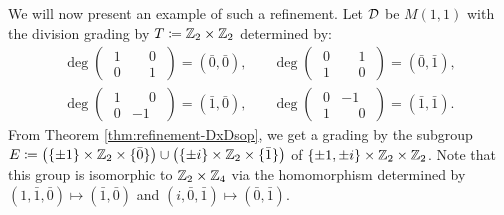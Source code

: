 We will now present an example of such a refinement.
Let $\mathcal{D}$ be $M(1,1)$ with the division grading by $T \coloneqq \mathbb{Z}_2 \times \mathbb{Z}_2$ determined by:
\begin{align*}
	\deg \begin{pmatrix}
		\phantom{.}1 & \phantom{-}0\phantom{.} \\
		\phantom{.}0 & \phantom{-}1\phantom{.}
	\end{pmatrix} = (\bar 0, \bar 0),\quad & \deg \begin{pmatrix}
		\phantom{.}0 & \phantom{-}1\phantom{.} \\
		\phantom{.}1 & \phantom{-}0\phantom{.}
	\end{pmatrix} = (\bar 0, \bar 1), \\
	\deg \begin{pmatrix}
		\phantom{.}1 & \phantom{-}0\phantom{.} \\
		\phantom{.}0 & -1\phantom{.}
	\end{pmatrix} = (\bar 1, \bar 0),\quad &
	\deg \begin{pmatrix}
		\phantom{.}0 & -1\phantom{.}           \\
		\phantom{.}1 & \phantom{-}0\phantom{.}
	\end{pmatrix} = (\bar 1, \bar 1).
\end{align*}
%
%
%
From Theorem \ref{thm:refinement-DxDsop}, we get a grading by the subgroup $E \coloneqq \big( \{ \pm 1 \} \times \mathbb{Z}_2 \times \{ \bar 0 \} \big) \cup \big( \{ \pm i \} \times \mathbb{Z}_2 \times \{ \bar 1 \} \big)$ of $\{\pm 1, \pm i\} \times \mathbb{Z}_2 \times \mathbb{Z}_2$.
Note that this group is isomorphic to $\mathbb{Z}_2 \times \mathbb{Z}_4$ via the homomorphism determined by $(1, \bar 1, \bar 0) \mapsto (\bar 1, \bar 0)$ and $(i, \bar 0, \bar 1) \mapsto (\bar 0, \bar 1)$.

